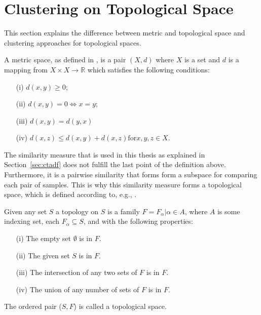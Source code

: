 \documentclass[thesis=B,english]{FITthesis}[2012/10/20]
\begin{document}
\section{Clustering on Topological Space}\label{sec:cluster_topo}
This section explains the difference between metric and topological space and clustering approaches for topological spaces.

A metric space, as defined in \cite{choudhary1992elements}, is a pair $(X, d)$ where $X$ is a set and $d$ is a mapping from  $X \times X \to \mathbb{R}$ which satisfies the following conditions:
\begin{enumerate}
    \item [(i)] $d(x, y) \geq 0$;
    \item [(ii)] $d(x, y) = 0 \iff x = y$;
    \item [(iii)] $d(x, y) = d(y, x)$
    \item [(iv)] $d(x, z) \leq d(x, y) + d(x, z) \mathrm{for} x, y, z \in X$.
\end{enumerate}

The similarity measure that is used in this thesis as explained in Section~\ref{sec:ctadf} does not fulfill the last point of the definition above. Furthermore, it is a pairwise similarity that forms form a subspace for comparing each pair of samples.
This is why this similarity measure forms a topological space, which is defined according to, e.g., \cite{stahl2014introduction}.

Given any set $S$ a topology on $S$ is a family $F ={F_{\alpha} | \alpha \in A}$, where $A$ is some indexing set, each $F_{\alpha}  \subseteq S$, and with the following properties:
\begin{enumerate}
    \item [(i)] The empty set $\emptyset$ is in $F$.
    \item [(ii)] The given set $S$ is in $F$.
    \item [(iii)] The intersection of any two sets of $F$ is in $F$.
    \item [(iv)] The union of any number of sets of $F$ is in $F$.
\end{enumerate}
The ordered pair ($S, F$) is called a topological space.

\end{document}
